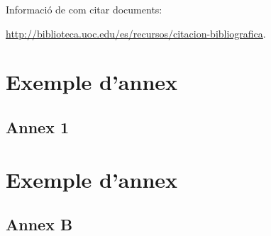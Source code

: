 \documentclass[CAT,BIB]{TFUOC}%
\begin{document}
Informació de com citar documents: 

\url{http://biblioteca.uoc.edu/es/recursos/citacion-bibliografica}.


\newpage
\appendix


 

\chapter{Exemple d'annex}

\section{Annex 1}


\chapter{Exemple d'annex}

\section{Annex B}
\end{document}
